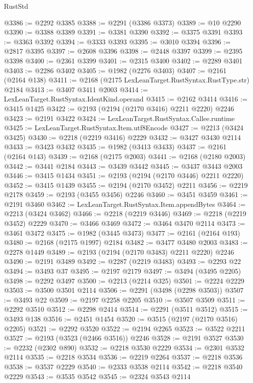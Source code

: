 \begin{lexlean}{RustStd}
\begin{coremodule}
{\begin{coremodule}
{{{{{{{{{{{{{{{{{{{{{{{{{{@3386 := @2292 @3385
@3388 := @2291 (@3386 @3373)
@3389 := @10 @2290
@3390 := @3388 @3389
@3391 := @3381 @3390
@3392 := @3375 @3391
@3393 := @3363 @3392
@3394 := @3333 @3393
@3395 := @3010 @3394
@3396 := @2817 @3395
@3397 := @2608 @3396
@3398 := @2448 @3397
@3399 := @2395 @3398
@3400 := @2361 @3399
@3401 := @2315 @3400
@3402 := @2289 @3401
@3403 := @2286 @3402
@3405 := @1982 (@2276 @3403)
@3407 := @2161 (@2164 @138)
@3411 := @2168 (@2175 LexLeanTarget.RustSyntax.RustType.str) @2184
@3413 := @3407 @3411 @2003
@3414 := LexLeanTarget.RustSyntax.IdentKind.operand
@3415 := @2162 @3414
@3416 := @3415 @1425
@3422 := @2193 (@2194 (@2170 @3416) @2211 @2220) @2246
@3423 := @2191 @3422
@3424 := LexLeanTarget.RustSyntax.Callee.runtime
@3425 := LexLeanTarget.RustSyntax.Item.utf8Encode
@3427 := @2213 (@3424 @3425)
@3430 := @2218 (@2219 @3416) @2229
@3432 := @3427 @3430 @2114
@3433 := @3423 @3432
@3435 := @1982 (@3413 @3433)
@3437 := @2161 (@2164 @143)
@3439 := @2168 (@2175 @2003)
@3441 := @2168 (@2180 @2003)
@3442 := @3441 @2184
@3443 := @3439 @3442
@3445 := @3437 @3443 @2003
@3446 := @3415 @1434
@3451 := @2193 (@2194 (@2170 @3446) @2211 @2220)
@3452 := @3415 @1439
@3455 := @2194 (@2170 @3452) @2211
@3456 := @2219 @2178
@3459 := @2193 (@3455 @3456) @2246
@3460 := @3451 @3459
@3461 := @2191 @3460
@3462 := LexLeanTarget.RustSyntax.Item.appendBytes
@3464 := @2213 (@3424 @3462)
@3466 := @2218 (@2219 @3446)
@3469 := @2218 (@2219 @3452) @2229
@3470 := @3466 @3469
@3472 := @3464 @3470 @2114
@3473 := @3461 @3472
@3475 := @1982 (@3445 @3473)
@3477 := @2161 (@2164 @193)
@3480 := @2168 (@2175 @1997) @2184
@3482 := @3477 @3480 @2003
@3483 := @2278 @1449
@3489 := @2193 (@2194 (@2170 @3483) @2211 @2220) @2246
@3490 := @2191 @3489
@3492 := @2287 (@2219 @3483)
@3493 := @2293 @22
@3494 := @3493 @37
@3495 := @2197 @2179
@3497 := @3494 (@3495 @2205)
@3498 := @2292 @3497
@3500 := @2213 (@2214 @325)
@3501 := @2224 @2229
@3503 := @3500 @3501 @2114
@3506 := @2291 (@3498 (@2298 @3503))
@3507 := @3493 @22
@3509 := @2197 @2258 @2205
@3510 := @3507 @3509
@3511 := @2292 @3510
@3512 := @2298 @2414
@3514 := @2291 (@3511 @3512)
@3515 := @3493 @138
@3516 := @2451 @1454
@3520 := @3515 (@2197 (@2170 @3516) @2205)
@3521 := @2292 @3520
@3522 := @2194 @2265
@3523 := @3522 @2211
@3527 := @2193 (@3523 (@2466 @3516)) @2246
@3528 := @2191 @3527
@3530 := @2232 (@2302 @890)
@3532 := @2218 @3530 @2229
@3534 := @2301 @3532 @2114
@3535 := @2218 @3534
@3536 := @2219 @2264
@3537 := @2218 @3536
@3538 := @3537 @2229
@3540 := @2333 @3538 @2114
@3542 := @2218 @3540 @2229
@3543 := @3535 @3542
@3545 := @2324 @3543 @2114
}}}}}}}}}}}}}}}}}}}}}}}}}}
\end{coremodule}}
\end{coremodule}
\end{lexlean}
